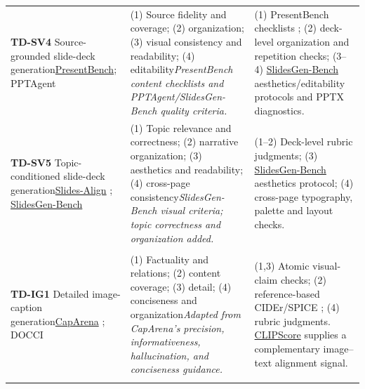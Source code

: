 \begin{longtable}{@{}P{3.45cm}P{3.55cm}P{5.68cm}@{}}
\addlinespace
\textbf{TD-SV4} Source-grounded slide-deck generation\newline \href{https://huggingface.co/datasets/PresentBench/PresentBench}{PresentBench}; PPTAgent \citep{pptagent2025} & (1) Source fidelity and coverage; (2) organization; (3) visual consistency and readability; (4) editability\newline\emph{PresentBench content checklists and PPTAgent/SlidesGen-Bench quality criteria.} & (1) PresentBench checklists \citep{presentbench2026}; (2) deck-level organization and repetition checks; (3--4) \href{https://github.com/yunqiaoyang/SlidesGen-Bench}{SlidesGen-Bench} \citep{yang2026slidesgen} aesthetics/editability protocols and PPTX diagnostics.\\
\addlinespace
\textbf{TD-SV5} Topic-conditioned slide-deck generation\newline \href{https://huggingface.co/datasets/Yqy6/Slides-Align}{Slides-Align} \citep{yang2026slidesgen}; \href{https://github.com/yunqiaoyang/SlidesGen-Bench}{SlidesGen-Bench} & (1) Topic relevance and correctness; (2) narrative organization; (3) aesthetics and readability; (4) cross-page consistency\newline\emph{SlidesGen-Bench visual criteria; topic correctness and organization added.} & (1--2) Deck-level rubric judgments; (3) \href{https://github.com/yunqiaoyang/SlidesGen-Bench}{SlidesGen-Bench} aesthetics protocol; (4) cross-page typography, palette and layout checks.\\
\addlinespace
{}\\*
\textbf{TD-IG1} Detailed image-caption generation\newline \href{https://github.com/njucckevin/CapArena}{CapArena} \citep{cheng2025caparena}; DOCCI \citep{onoe2025docci} & (1) Factuality and relations; (2) content coverage; (3) detail; (4) conciseness and organization\newline\emph{Adapted from CapArena's precision, informativeness, hallucination, and conciseness guidance.} & (1,3) Atomic visual-claim checks; (2) reference-based CIDEr/SPICE \citep{vedantam2015cider,anderson2016spice}; (4) rubric judgments. \href{https://github.com/jmhessel/clipscore}{CLIPScore} \citep{hessel2021clipscore} supplies a complementary image--text alignment signal.\\
\addlinespace

\end{longtable}
